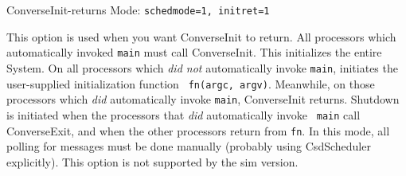 ConverseInit-returns Mode: {\tt schedmode=1, initret=1}

This option is used when you want ConverseInit to return.  All
processors which automatically invoked {\tt main} must call
ConverseInit.  This initializes the entire \converse{} System.  On all
processors which {\em did not} automatically invoke {\tt main},
\converse{} initiates the user-supplied initialization function {\tt
fn(argc, argv)}.  Meanwhile, on those processors which {\em did}
automatically invoke {\tt main}, ConverseInit returns.  Shutdown is
initiated when the processors that {\em did} automatically invoke {\tt
main} call ConverseExit, and when the other processors return from
{\tt fn}.  In this mode, all polling for messages must be done
manually (probably using CsdScheduler explicitly).  This option is not
supported by the sim version.





